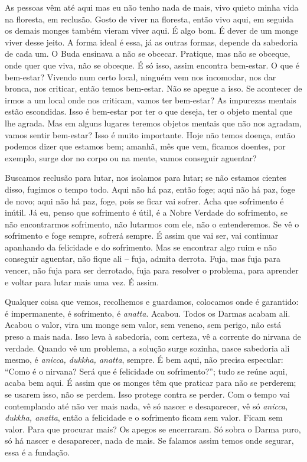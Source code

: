 As pessoas vêm até aqui mas eu não tenho nada de mais, vivo quieto
minha vida na floresta, em reclusão. Gosto de viver na floresta, então
vivo aqui, em seguida os demais monges também vieram viver aqui. É algo
bom. É dever de um monge viver desse jeito. A forma ideal é essa, já as
outras formas, depende da sabedoria de cada um. O Buda ensinava a não
se obcecar. Pratique, mas não se obceque, onde quer que viva, não se
obceque. É só isso, assim encontra bem-estar. O que é bem-estar?
Vivendo num certo local, ninguém vem nos incomodar, nos dar bronca, nos
criticar, então temos bem-estar. Não se apegue a isso. Se acontecer de
irmos a um local onde nos criticam, vamos ter bem-estar? As impurezas
mentais estão escondidas. Isso é bem-estar por ter o que deseja, ter o
objeto mental que lhe agrada. Mas em alguns lugares teremos objetos
mentais que não nos agradam, vamos sentir bem-estar? Isso é muito
importante. Hoje não temos doença, então podemos dizer que estamos bem;
amanhã, mês que vem, ficamos doentes, por exemplo, surge dor no corpo
ou na mente, vamos conseguir aguentar? 

Buscamos reclusão para lutar, nos isolamos para lutar; se não
estamos cientes disso, fugimos o tempo todo. Aqui não há paz, então
foge; aqui não há paz, foge de novo; aqui não há paz, foge, pois se
ficar vai sofrer. Acha que sofrimento é inútil. Já eu, penso que
sofrimento é útil, é a Nobre Verdade do sofrimento, se não encontrarmos
sofrimento, não lutarmos com ele, não o entenderemos. Se vê o
sofrimento e foge sempre, sofrerá sempre. É assim que vai ser, vai
continuar apanhando da felicidade e do sofrimento. Mas se encontrar
algo ruim e não conseguir aguentar, não fique ali – fuja, admita
derrota. Fuja, mas fuja para vencer, não fuja para ser derrotado, fuja
para resolver o problema, para aprender e voltar para lutar mais uma
vez. É assim. 

Qualquer coisa que vemos, recolhemos e guardamos, colocamos onde é
garantido: é impermanente, é sofrimento, é \textit{anatta}. Acabou.
Todos os Darmas acabam ali. Acabou o valor, vira um monge sem valor,
sem veneno, sem perigo, não está preso a mais nada. Isso leva à
sabedoria, com certeza, vê a corrente do nirvana de verdade. Quando vê
um problema, a solução surge sozinha, nasce sabedoria ali mesmo, é
\textit{anicca, dukkha, anatta}, sempre. É bem aqui, não precisa
especular: “Como é o nirvana? Será que é felicidade ou sofrimento?”;
tudo se reúne aqui, acaba bem aqui. É assim que os monges têm que
praticar para não se perderem; se usarem isso, não se perdem. Isso
protege contra se perder. Com o tempo vai contemplando até não ver mais
nada, vê só nascer e desaparecer, vê só \textit{anicca, dukkha,
anatta}, então a felicidade e o sofrimento ficam sem valor. Ficam sem
valor. Para que procurar mais? Os apegos se encerraram. Só sobra o
Darma puro, só há nascer e desaparecer, nada de mais. Se falamos assim
temos onde segurar, essa é a fundação.

